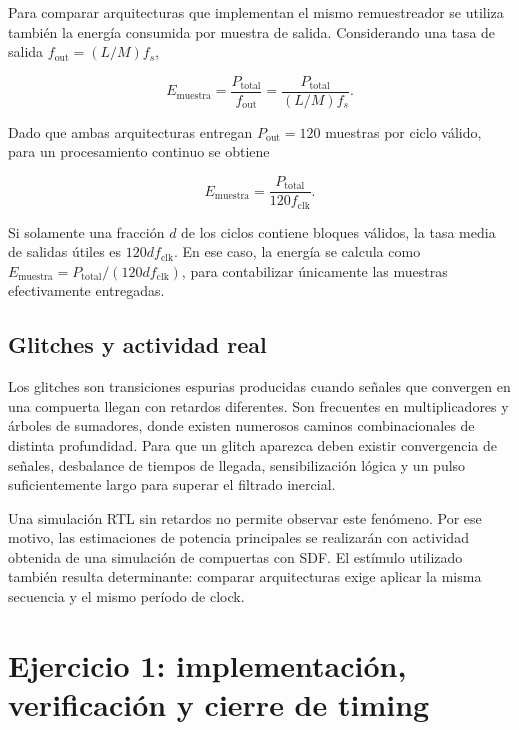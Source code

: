 \documentclass[10pt,a4paper]{article}
\begin{document}
Para comparar arquitecturas que implementan el mismo remuestreador
se utiliza también la energía consumida por muestra de salida.
Considerando una tasa de salida $f_{\mathrm{out}}=(L/M)f_s$,

\begin{equation}
E_{\mathrm{muestra}}=
\frac{P_{\mathrm{total}}}{f_{\mathrm{out}}}
=
\frac{P_{\mathrm{total}}}{(L/M)f_s}.
\label{eq:energy-per-sample}
\end{equation}

Dado que ambas arquitecturas entregan $P_{\mathrm{out}}=120$
muestras por ciclo válido, para un procesamiento continuo se obtiene

\begin{equation}
E_{\mathrm{muestra}}=
\frac{P_{\mathrm{total}}}{120f_{\mathrm{clk}}}.
\label{eq:energy-per-sample-parallel}
\end{equation}

Si solamente una fracción $d$ de los ciclos contiene bloques válidos, la tasa
media de salidas útiles es $120d f_{\mathrm{clk}}$. En ese caso, la energía se
calcula como $E_{\mathrm{muestra}}=P_{\mathrm{total}}/(120d f_{\mathrm{clk}})$,
para contabilizar únicamente las muestras efectivamente entregadas.

\subsection{Glitches y actividad real}

Los glitches son transiciones espurias producidas cuando señales que convergen en
una compuerta llegan con retardos diferentes. Son frecuentes en multiplicadores y
árboles de sumadores, donde existen numerosos caminos combinacionales de distinta
profundidad. Para que un glitch aparezca deben existir convergencia de señales,
desbalance de tiempos de llegada, sensibilización lógica y un pulso suficientemente
largo para superar el filtrado inercial.

Una simulación RTL sin retardos no permite observar este fenómeno. Por ese motivo,
las estimaciones de potencia principales se realizarán con actividad obtenida de una
simulación de compuertas con SDF. El estímulo utilizado también resulta determinante:
comparar arquitecturas exige aplicar la misma secuencia y el mismo período de clock.

\section{Ejercicio 1: implementación, verificación y cierre de timing}
\label{sec:ejercicio-1}
\end{document}
